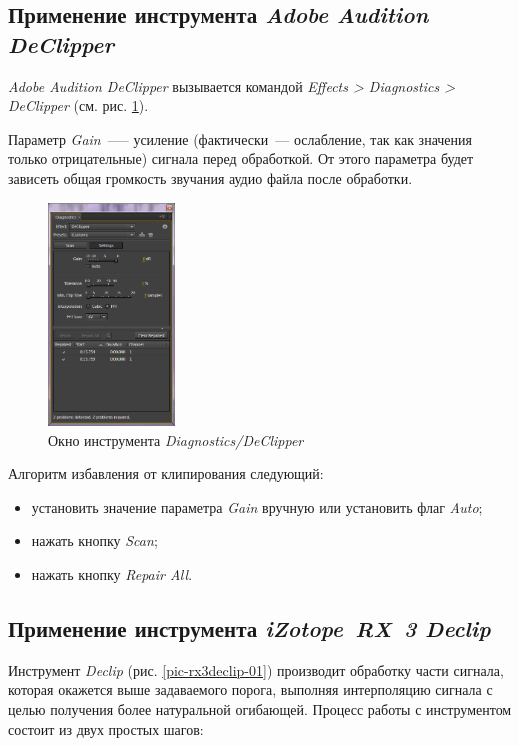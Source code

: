 \documentclass[oneside, final, 14pt]{extreport}
\begin{document}
\subsection{Применение инструмента \emph{Adobe Audition DeClipper}}
\textit{Adobe Audition DeClipper} вызывается командой \textit{Effects > Diagnostics > DeClipper} (см. рис. \ref{pic-declipper-01}).

Параметр \emph{Gain}~--— усиление (фактически~--– ослабление, так как значения только отрицательные) сигнала перед обработкой. От этого параметра будет зависеть общая громкость звучания аудио файла после обработки.

\begin{figure}[ht!]
\centering
\includegraphics[width=0.3\textwidth]{pic-declipper-01}
\caption{Окно инструмента \textit{Diagnostics/DeClipper}}
\label{pic-declipper-01}
\end{figure}

Алгоритм избавления от клипирования следующий:
\begin{itemize}
\item установить значение параметра \textit{Gain} вручную или установить флаг \textit{Auto};
\item нажать кнопку \textit{Scan};
\item нажать кнопку \textit{Repair All}.
\end{itemize}

\subsection{Применение инструмента \emph{iZotope~RX~3 Declip}}

Инструмент \emph{Declip} (рис. \ref{pic-rx3declip-01}) производит обработку части сигнала, которая окажется выше задаваемого порога, выполняя интерполяцию сигнала с целью получения более натуральной огибающей. Процесс работы с инструментом состоит из двух простых шагов:
\end{document}
